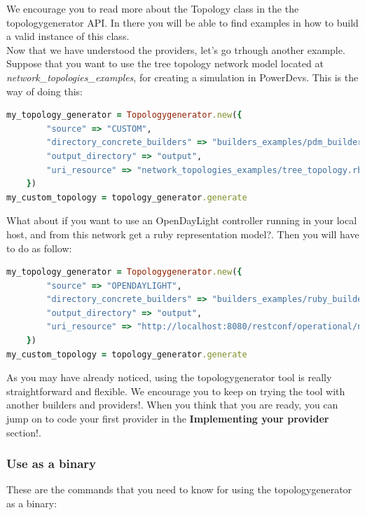 We encourage you to read more about the Topology class in the the topologygenerator API. In there you will be able to find examples in how to build a valid instance of this class.\\

Now that we have understood the providers, let's go trhough another example. Suppose that you want to use the tree topology network model located at \textit{network\_topologies\_examples}, for creating a simulation in PowerDevs. This is the way of doing this:

\begin{lstlisting}[language=Ruby,breaklines=true]
my_topology_generator = Topologygenerator.new({
        "source" => "CUSTOM",
        "directory_concrete_builders" => "builders_examples/pdm_builders",
        "output_directory" => "output",
        "uri_resource" => "network_topologies_examples/tree_topology.rb" 
    })
my_custom_topology = topology_generator.generate
\end{lstlisting}

What about if you want to use an OpenDayLight controller running in your local host, and from this network get a ruby representation model?. Then you will have to do as follow:

\begin{lstlisting}[language=Ruby,breaklines=true]
my_topology_generator = Topologygenerator.new({
        "source" => "OPENDAYLIGHT",
        "directory_concrete_builders" => "builders_examples/ruby_builders",
        "output_directory" => "output",
        "uri_resource" => "http://localhost:8080/restconf/operational/network-topology:network-topology/topology/flow:1/" 
    }) 
my_custom_topology = topology_generator.generate
\end{lstlisting}

As you may have already noticed, using the topologygenerator tool is really straightforward and flexible. We encourage you to keep on trying the tool with another builders and providers!. When you think that you are ready, you can jump on to code your first provider in the \textbf{Implementing your provider} section!.

\subsubsection{Use as a binary}

These are the commands that you need to know for using the topologygenerator as a binary:

